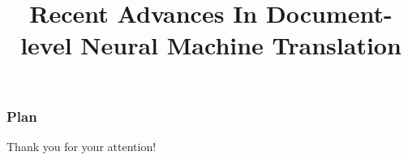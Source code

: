 \documentclass[11.5pt, aspectratio=169]{beamer} %
\title[]{Recent Advances In Document-level Neural Machine Translation}
\author[L.\,Lupo]
{%
  \texorpdfstring{
    \begin{columns}%
      \column{1\linewidth}
      \centering
      Lorenzo Lupo\\
      \medskip
      Supervisors: Laurent Besacier, Marco Dinarelli\\
    \end{columns}
  }
  {Lorenzo Lupo}
}
\begin{document}
\begin{frame}[plain]
	\titlepage
\end{frame}





\begin{frame}
\frametitle{Plan} %
\tableofcontents %
\end{frame}


%
%


\begin{frame}[c]{}
  \begin{center}
	  \Huge Thank you for your attention!
  \end{center} 
\end{frame}


\appendix
\backupbegin

\begin{frame}[allowframebreaks]
\frametitle{\refname}

\end{frame}

%

\backupend
\end{document}
